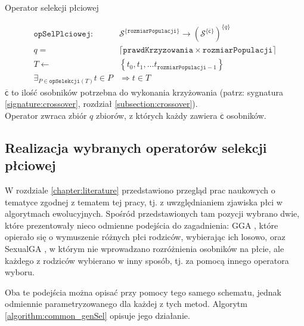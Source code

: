 \documentclass[twoside]{iisthesis}
\newcommand{\important}[1]{\mathcal{#1}}
\newcommand{\param}[1]{\mathtt{#1}}
\newcommand{\variable}[1]{\mathsf{#1}}
\newcommand{\inputVar}[1]{\variable{\overline{#1}}}
\newcommand{\withSize}[2]{{#1}^{ \{ #2 \}}}
\begin{document}
\begin{signature}
	\caption{Operator selekcji płciowej \label{signature:genSel}}
	\begin{align}
		\param{opSelPlciowej}: &\withSize{ \important{S}}{\param{rozmiarPopulacji} } \rightarrow \withSize{ ( \withSize{\important{S}  }{\inputVar{c}} ) }{q} \\
		q = & \lceil \param{prawdKrzyzowania} \times \param{rozmiarPopulacji} \rceil \\
		T \gets &\left\{ t_0, t_1, \ldots t_{\param{rozmiarPopulacji}-1} \right\} \\
		\exists_{P \in \param{opSelekcji}(T)} t \in P &\Rightarrow t \in T
	\end{align}	
	$\inputVar{c}$ to ilość osobników potrzebna do wykonania krzyżowania (patrz: sygnatura \ref{signature:crossover}, rozdział \ref{subsection:crossover}). \\
	Operator zwraca zbiór $q$ zbiorów, z których każdy zawiera $\inputVar{c}$ osobników.
\end{signature}

\subsection{Realizacja wybranych operatorów selekcji płciowej} \label{subsection:literatureRealization}

W rozdziale \ref{chapter:literature} przedstawiono przegląd prac naukowych o tematyce zgodnej z tematem tej pracy, tj. z uwzględnianiem zjawiska płci w algorytmach ewolucyjnych.
Spośród przedstawionych tam pozycji wybrano dwie, które prezentowały nieco odmienne podejścia do zagadnienia: GGA \cite{GGA}, które opierało się o wymuszenie różnych płci rodziców, wybierając ich losowo, oraz SexualGA \cite{SexualGA}, w którym nie wprowadzano rozróżnienia osobników na płcie, ale każdego z rodziców wybierano w inny sposób, tj. za pomocą innego operatora wyboru.

Oba te podejścia można opisać przy pomocy tego samego schematu, jednak odmiennie parametryzowanego dla każdej z tych metod. Algorytm \ref{algorithm:common_genSel} opisuje jego działanie.
\end{document}
